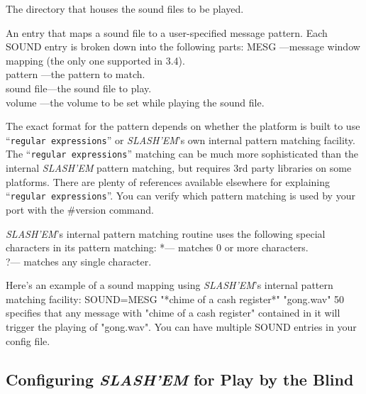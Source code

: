 \item[\bb{SOUNDDIR}]
The directory that houses the sound files to be played.

\item[\bb{SOUND}]
An entry that maps a sound file to a user-specified message pattern.
Each SOUND entry is broken down into the following parts:
MESG      ---message window mapping (the only one supported in 3.4).\\
pattern   ---the pattern to match.\\
sound file---the sound file to play.\\
volume    ---the volume to be set while playing the sound file.
\elist
\nd %

The exact format for the pattern depends on whether the platform is
built to use ``{\tt regular expressions}'' or {\it SLASH'EM\/}'s own internal pattern 
matching facility. The ``{\tt regular expressions}'' matching can be much more 
sophisticated than the internal {\it SLASH'EM\/} pattern matching, but requires 
3rd party libraries on some platforms.  There are plenty of references 
available elsewhere for explaining ``{\tt regular expressions}''. You can verify 
which pattern matching is used by your port with the \#version command.  

{\it SLASH'EM\/}'s internal pattern matching routine uses the following
special characters in its pattern matching:
  *--- matches 0 or more characters.\\
  ?--- matches any single character.

Here's an example of a sound mapping using {\it SLASH'EM\/}'s internal
pattern matching facility:
    SOUND=MESG "*chime of a cash register*" "gong.wav" 50
specifies that any message with "chime of a cash register" contained
in it will trigger the playing of "gong.wav".  You can have multiple
SOUND entries in your config file.

\subsection*{Configuring {\it SLASH'EM\/} for Play by the Blind}


